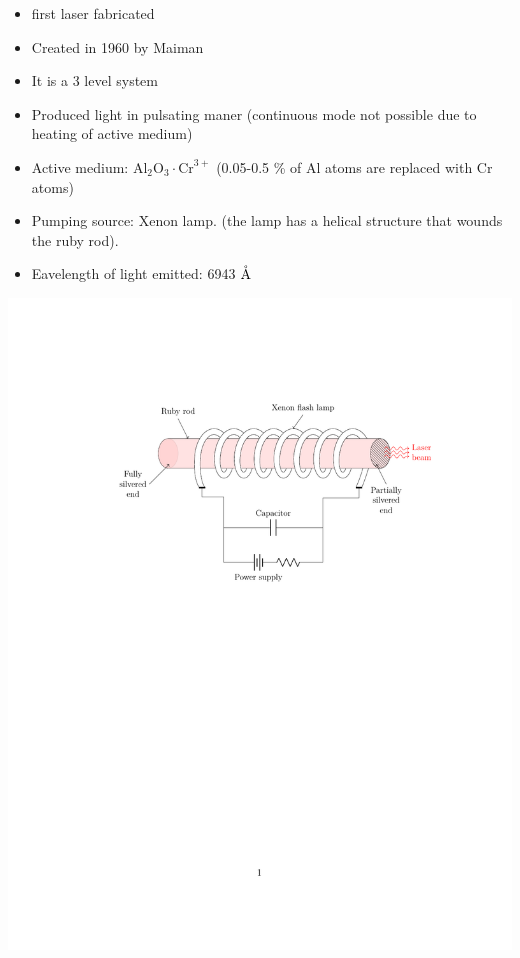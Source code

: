 \documentclass[12pt, a4paper]{article}
\begin{document}
\begin{itemize}
	\item first laser fabricated
	\item Created in 1960 by Maiman
	\item It is a 3 level system
	\item Produced light in pulsating maner (continuous mode not possible due to heating of active medium)
	\item Active medium: $\mathrm{Al}_{2} \mathrm{O}_{3} \cdot \mathrm{Cr}^{3+}$ (0.05-0.5 \% of Al atoms are replaced with Cr atoms)
	\item Pumping source: Xenon lamp. (the lamp has a helical structure that wounds the ruby rod).
	\item Eavelength of light emitted: 6943 $\mathring{\textrm{A}}$
\end{itemize}

\begin{center}
	\includegraphics[max width=\textwidth]{ruby-laser}
\end{center}
\end{document}
